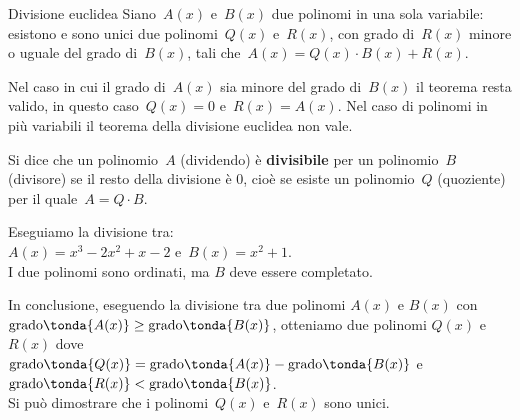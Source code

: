 \begin{teorema}{Divisione euclidea}{}
Siano~\(A(x)\) e~\(B(x)\) due polinomi in una sola variabile: esistono 
e sono unici due polinomi~\(Q(x)\) e~\(R(x)\), con grado di~\(R(x)\)
minore o uguale del grado di~\(B(x)\), tali che~\(A(x)=Q(x)\cdot B(x)+R(x)\).
\end{teorema}

\begin{osservazione}{}{} 
Nel caso in cui il grado di~\(A(x)\) sia minore del grado di~\(B(x)\) 
il teorema resta valido, in questo caso~\(Q(x)=0\) e~\(R(x)=A(x)\).
Nel caso di polinomi in più variabili il teorema della divisione 
euclidea non vale.
\end{osservazione}

\begin{definizione}{}{}
Si dice che un polinomio~\(A\) (dividendo) è
 \textbf{divisibile} per un
polinomio~\(B\)  (divisore) se il resto della divisione è \(0\), cioè
se esiste un polinomio~\(Q\) (quoziente) per il quale~\(A = Q \cdot B\).
\end{definizione}

\begin{esempio}{}{}
Eseguiamo la divisione tra: \\
\(A(x)=x^3-2x^2+x-2\) e~\(B(x)=x^2+1\).\\

I due polinomi sono ordinati, ma \(B\) deve essere completato. 

\end{esempio}

In conclusione, eseguendo la divisione tra due polinomi 
\(A(x)\) e \(B(x)\) con \\
\(\text{grado}\tonda{A(x)} \ge \text{grado}\tonda{B(x)}\), 
otteniamo due polinomi \(Q(x)\) e \(R(x)\) dove \\
\(\text{grado}\tonda{Q(x)} = \text{grado}\tonda{A(x)} - 
\text{grado}\tonda{B(x)}\) e 
\(\text{grado}\tonda{R(x)} < \text{grado}\tonda{B(x)}\).\\
Si può dimostrare che i polinomi~\(Q(x)\) e~\(R(x)\) sono unici.

